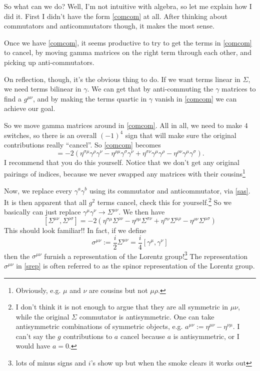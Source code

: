 \documentclass[main.tex]{subfiles}
\begin{document}
So what can we do?  Well, I'm not intuitive with algebra, so let me explain how I did it. First I didn't have the form \ref{comcom} at all. After thinking about commutators and anticommutators though, it makes the most sense. 

Once we have \ref{comcom}, it seems productive to try to get the terms in \ref{comcom} to cancel, by moving gamma matrices on the right term through each other, and picking up anti-commutators.

On reflection, though, it's the obvious thing to do. If we want terms linear in $\Sigma$, we need terms bilinear in $\gamma$. We can get that by anti-commuting the $\gamma$ matrices to find a  $g^{\mu \nu}$, and by making the terms quartic in $\gamma$ vanish in \ref{comcom} we can achieve our goal. 

So we move gamma matrices around in \ref{comcom}. All in all, we need to make $4$ switches, so there is an overall $(-1)^4$ sign that will make sure the original contributions really ``cancel''. So \ref{comcom} becomes
\[
=-2( \eta^{\sigma \mu} \gamma^{\rho} \gamma^{\nu} -\eta^{\rho \mu} \gamma^\sigma \gamma^\nu + \eta^{\sigma \nu} \gamma^\mu \gamma^\rho - \eta^{\rho \nu} \gamma^\mu \gamma^\sigma).
\]
I recommend that you do this yourself. Notice that we don't get any original pairings of indices, because we never swapped any matrices with their cousins\footnote{Obviously, e.g. $\mu$ and $\nu$ are cousins but not $\mu \rho$.}

Now, we replace every $\gamma^a \gamma^b$ using its commutator and anticommutator, via \ref{sas}. It is then apparent that all $g^2$ terms cancel, check this for yourself.\footnote{I don't think it is not enough to argue that they are all symmetric in $\mu \nu$, while the original $\Sigma$ commutator is antisymmetric. One can take antisymmetric combinations of symmetric objects, e.g. $a^{\mu \nu} := \eta^{\mu \nu} - \eta^{\nu \mu}$. I can't say the $g$ contributions to $a$ cancel because $a$ is antisymmetric, or I would have $a = 0$.} So we basically can just replace $\gamma^\mu \gamma^\nu \to \Sigma^{\mu \nu}$. We then have
\[
[\Sigma^{\mu \nu},\Sigma^{\rho \sigma}] = -2 \left(
\eta^{\sigma \mu} \Sigma^{\rho \nu} -\eta^{\rho \mu} \Sigma^{\sigma \nu} + \eta^{\sigma \nu} \Sigma^{\mu \rho} - \eta^{\rho \nu} \Sigma^{\mu \sigma}
\right)
\]
This should look familiar!! In fact, if we define
\begin{equation} \label{srep}
\sigma^{\mu \nu} := \frac{i}{2} \Sigma^{\mu \nu} = \frac{i}{4} [\gamma^\mu,\gamma^\nu]
\end{equation}
then the $\sigma^{\mu \nu}$ furnish a representation of the Lorentz group!\footnote{lots of minus signs and $i$'s show up but when the smoke clears it works out} The representation $\sigma^{\mu \nu}$ in \ref{srep} is often referred to as the spinor representation of the Lorentz group. 
\end{document}
